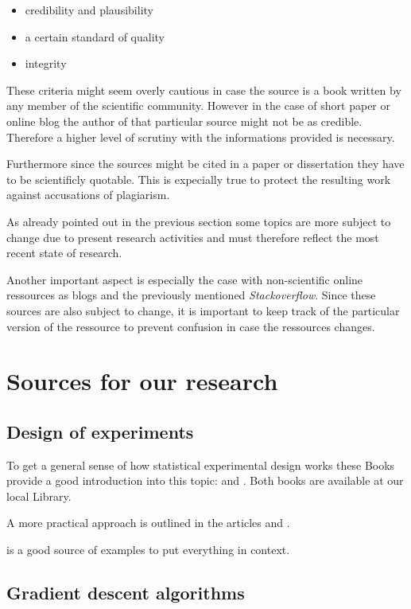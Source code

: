 \documentclass[titlepage, a4paper, 11pt]{scrartcl}
\begin{document}
\begin{itemize}
    \item credibility and plausibility
    \item a certain standard of quality
    \item integrity
\end{itemize}

These criteria might seem overly cautious in case the source is a book written by any member of the scientific community. However in the case of short paper or online blog
the author of that particular source might not be as credible. Therefore a higher level of scrutiny with the informations provided is necessary.

Furthermore since the sources might be cited in a paper or dissertation they have to be scientificly quotable. This is expecially true to protect the resulting work against 
accusations of plagiarism.

As already pointed out in the previous section some topics are more subject to change due to present research activities
and must therefore reflect the most recent state of research. 

Another important aspect is especially the case with non-scientific online ressources as blogs and the previously mentioned
\textit{Stackoverflow}. Since these sources are also subject to change, it is important to keep track of the particular
version of the ressource to prevent confusion in case the ressources changes.

\section{Sources for our research}

\subsection{Design of experiments}

To get a general sense of how statistical experimental design works these Books provide a good introduction into this topic: \citep{siebertz2017statistische} and \citep{retzlaff1978statistische}.
Both books are available at our local Library.

A more practical approach is outlined in the articles \citep{hoevelmann1993statistische} and \citep{schweitzer1992off}.

\citep{siebertz2017doe} is a good source of examples to put everything in context.

\subsection{Gradient  descent  algorithms}
\end{document}
